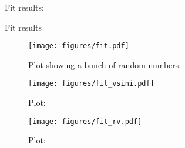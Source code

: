 \documentclass[twocolumn]{aastex631}
\begin{document}
Fit results:
\begin{table*}[ht!]
    \centering
    \caption{Fit results}
    \label{tab:my_table}
    
\end{table*}


\begin{figure*}[ht!]
    \begin{centering}
        \texttt{[image: figures/fit.pdf]}
        \caption{
            Plot showing a bunch of random numbers.
        }
        \label{fig:fit}
    \end{centering}
\end{figure*}

\begin{figure}[ht!]
    \begin{centering}
        \texttt{[image: figures/fit\_vsini.pdf]}
        \caption{
            Plot: 
        }
        \label{fig:fit_vsini}
    \end{centering}
\end{figure}

\begin{figure}[ht!]
    \begin{centering}
        \texttt{[image: figures/fit\_rv.pdf]}
        \caption{
            Plot: 
        }
        \label{fig:fit_rv}
    \end{centering}
\end{figure}


\end{document}
